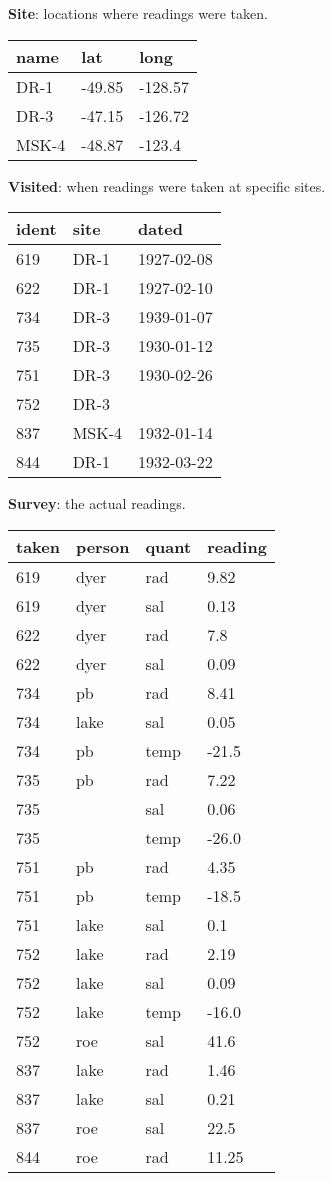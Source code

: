 \textbf{Site}: locations where readings were taken.

\begin{tabular}{lll}
name & lat & long \\
\hline
DR-1 & -49.85 & -128.57 \\
DR-3 & -47.15 & -126.72 \\
MSK-4 & -48.87 & -123.4 \\
\end{tabular}

\textbf{Visited}: when readings were taken at specific sites.

\begin{tabular}{lll}
ident & site & dated \\
\hline
619 & DR-1 & 1927-02-08 \\
622 & DR-1 & 1927-02-10 \\
734 & DR-3 & 1939-01-07 \\
735 & DR-3 & 1930-01-12 \\
751 & DR-3 & 1930-02-26 \\
752 & DR-3 & ~ \\
837 & MSK-4 & 1932-01-14 \\
844 & DR-1 & 1932-03-22 \\
\end{tabular}

\textbf{Survey}: the actual readings.

\begin{tabular}{llll}
taken & person & quant & reading \\
\hline
619 & dyer & rad & 9.82 \\
619 & dyer & sal & 0.13 \\
622 & dyer & rad & 7.8 \\
622 & dyer & sal & 0.09 \\
734 & pb & rad & 8.41 \\
734 & lake & sal & 0.05 \\
734 & pb & temp & -21.5 \\
735 & pb & rad & 7.22 \\
735 & ~ & sal & 0.06 \\
735 & ~ & temp & -26.0 \\
751 & pb & rad & 4.35 \\
751 & pb & temp & -18.5 \\
751 & lake & sal & 0.1 \\
752 & lake & rad & 2.19 \\
752 & lake & sal & 0.09 \\
752 & lake & temp & -16.0 \\
752 & roe & sal & 41.6 \\
837 & lake & rad & 1.46 \\
837 & lake & sal & 0.21 \\
837 & roe & sal & 22.5 \\
844 & roe & rad & 11.25 \\
\end{tabular}

